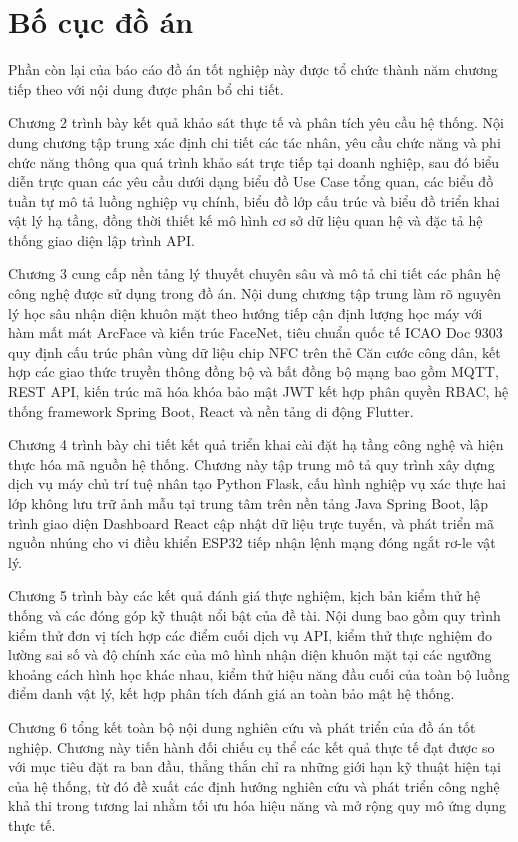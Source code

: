 \documentclass[../DoAn.tex]{subfiles}
\begin{document}
\section{Bố cục đồ án}
\label{section:1.4}

Phần còn lại của báo cáo đồ án tốt nghiệp này được tổ chức thành năm chương tiếp theo với nội dung được phân bổ chi tiết.

Chương 2 trình bày kết quả khảo sát thực tế và phân tích yêu cầu hệ thống. Nội dung chương tập trung xác định chi tiết các tác nhân, yêu cầu chức năng và phi chức năng thông qua quá trình khảo sát trực tiếp tại doanh nghiệp, sau đó biểu diễn trực quan các yêu cầu dưới dạng biểu đồ Use Case tổng quan, các biểu đồ tuần tự mô tả luồng nghiệp vụ chính, biểu đồ lớp cấu trúc và biểu đồ triển khai vật lý hạ tầng, đồng thời thiết kế mô hình cơ sở dữ liệu quan hệ và đặc tả hệ thống giao diện lập trình API.

Chương 3 cung cấp nền tảng lý thuyết chuyên sâu và mô tả chi tiết các phân hệ công nghệ được sử dụng trong đồ án. Nội dung chương tập trung làm rõ nguyên lý học sâu nhận diện khuôn mặt theo hướng tiếp cận định lượng học máy với hàm mất mát ArcFace và kiến trúc FaceNet, tiêu chuẩn quốc tế ICAO Doc 9303 quy định cấu trúc phân vùng dữ liệu chip NFC trên thẻ Căn cước công dân, kết hợp các giao thức truyền thông đồng bộ và bất đồng bộ mạng bao gồm MQTT, REST API, kiến trúc mã hóa khóa bảo mật JWT kết hợp phân quyền RBAC, hệ thống framework Spring Boot, React và nền tảng di động Flutter.

Chương 4 trình bày chi tiết kết quả triển khai cài đặt hạ tầng công nghệ và hiện thực hóa mã nguồn hệ thống. Chương này tập trung mô tả quy trình xây dựng dịch vụ máy chủ trí tuệ nhân tạo Python Flask, cấu hình nghiệp vụ xác thực hai lớp không lưu trữ ảnh mẫu tại trung tâm trên nền tảng Java Spring Boot, lập trình giao diện Dashboard React cập nhật dữ liệu trực tuyến, và phát triển mã nguồn nhúng cho vi điều khiển ESP32 tiếp nhận lệnh mạng đóng ngắt rơ-le vật lý.

Chương 5 trình bày các kết quả đánh giá thực nghiệm, kịch bản kiểm thử hệ thống và các đóng góp kỹ thuật nổi bật của đề tài. Nội dung bao gồm quy trình kiểm thử đơn vị tích hợp các điểm cuối dịch vụ API, kiểm thử thực nghiệm đo lường sai số và độ chính xác của mô hình nhận diện khuôn mặt tại các ngưỡng khoảng cách hình học khác nhau, kiểm thử hiệu năng đầu cuối của toàn bộ luồng điểm danh vật lý, kết hợp phân tích đánh giá an toàn bảo mật hệ thống.

Chương 6 tổng kết toàn bộ nội dung nghiên cứu và phát triển của đồ án tốt nghiệp. Chương này tiến hành đối chiếu cụ thể các kết quả thực tế đạt được so với mục tiêu đặt ra ban đầu, thẳng thắn chỉ ra những giới hạn kỹ thuật hiện tại của hệ thống, từ đó đề xuất các định hướng nghiên cứu và phát triển công nghệ khả thi trong tương lai nhằm tối ưu hóa hiệu năng và mở rộng quy mô ứng dụng thực tế.
\end{document}
